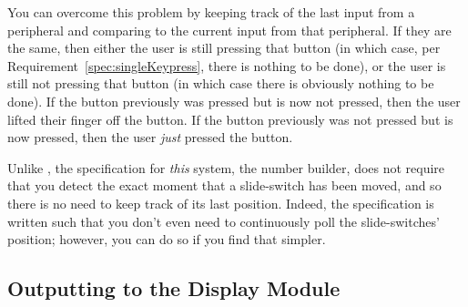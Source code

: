 You can overcome this problem by keeping track of the last input from a peripheral and comparing to the current input from that peripheral.
If they are the same, then either the user is still pressing that button (in which case, per Requirement~\ref{spec:singleKeypress}, there is nothing to be done), or the user is still not pressing that button (in which case there is obviously nothing to be done).
If the button previously was pressed but is now not pressed, then the user lifted their finger off the button.
If the button previously was not pressed but is now pressed, then the user \textit{just} pressed the button.

Unlike , the specification for \textit{this} system, the number builder, does not require that you detect the exact moment that a slide-switch has been moved, and so there is no need to keep track of its last position.
Indeed, the specification is written such that you don't even need to continuously poll the slide-switches' position;
however, you can do so if you find that simpler.


%
%


\subsection{Outputting to the Display Module}

